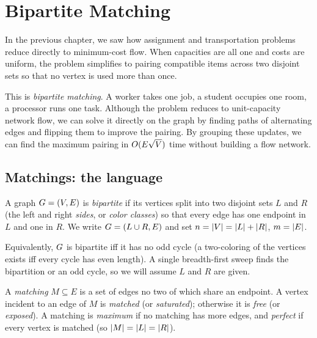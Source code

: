 \chapter{Bipartite Matching}

In the previous chapter, we saw how assignment and transportation problems reduce directly to minimum-cost flow.
When capacities are all one and costs are uniform, the problem simplifies to pairing compatible items
across two disjoint sets so that no vertex is used more than once.

This is \emph{bipartite matching}. A worker takes one job, a student occupies one room, a processor
runs one task. Although the problem reduces to unit-capacity network flow, we can solve it directly on the graph by finding paths of alternating edges and flipping them to improve the pairing. By grouping these updates, we can find the maximum pairing in $O(E\sqrt{V})$ time without building a flow network.

\chapterline

\section{Matchings: the language}
\label{ch15:language}

\begin{definition}
\label{ch15:def-bipartite}
A graph $G=(V,E)$ is \emph{bipartite} if its vertices split into two disjoint
sets $L$ and $R$ (the left and right \emph{sides}, or \emph{color classes}) so
that every edge has one endpoint in $L$ and one in $R$. We write
$G=(L\cup R,E)$ and set $n=\lvert V\rvert=\lvert L\rvert+\lvert R\rvert$, $m=\lvert E\rvert$.
\end{definition}

Equivalently, $G$ is bipartite iff it has no odd cycle (a two-coloring of the
vertices exists iff every cycle has even length). A single breadth-first sweep
finds the bipartition or an odd cycle, so we will assume $L$ and $R$ are given.

\begin{definition}[Matching]
\label{ch15:def-matching}
A \emph{matching} $M\subseteq E$ is a set of edges no two of which share an
endpoint. A vertex incident to an edge of $M$ is \emph{matched} (or
\emph{saturated}); otherwise it is \emph{free} (or \emph{exposed}). A matching is
\emph{maximum} if no matching has more edges, and \emph{perfect} if every vertex
is matched (so $\lvert M\rvert=\lvert L\rvert=\lvert R\rvert$).
\end{definition}

